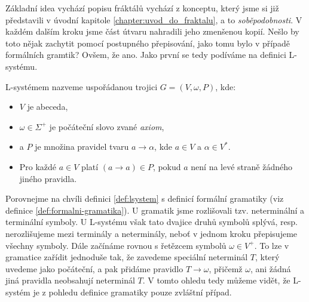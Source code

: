Základní idea vychází popisu fráktálů vychází z konceptu, který jsme si již představili v úvodní kapitole \ref{chapter:uvod_do_fraktalu}, a to \emph{soběpodobnosti}. V každém dalším kroku jsme část útvaru nahradili jeho zmenšenou kopií. Nešlo by toto nějak zachytit pomocí postupného přepisování, jako tomu bylo v případě formálních gramtik? Ovšem, že ano. Jako první se tedy podíváme na definici L-systému.
\begin{definition}[L-systém]\label{def:lsystem}
    L-systémem nazveme uspořádanou trojici $G=(V,\omega,P)$, kde:
    \begin{itemize}
        \item $V$ je abeceda,
        \item $\omega\in\Sigma^+$ je počáteční slovo zvané \emph{axiom},
        \item a $P$ je množina pravidel tvaru $a\to\alpha$, kde $a\in V$ a $\alpha\in V^*$.
        \item Pro každé $a\in V$ platí $(a\to a)\in P$, pokud $a$ není na levé straně žádného jiného pravidla.
    \end{itemize}
\end{definition}
Porovnejme na chvíli definici \ref{def:lsystem} s definicí formální gramatiky (viz definice \ref{def:formalni-gramatika}). U gramatik jsme rozlišovali tzv. neterminální a terminální symboly. U L-systému však tato dvajice druhů symbolů splývá, resp. nerozlišujeme mezi terminály a neterminály, neboť v jednom kroku přepisujeme všechny symboly. Dále začínáme rovnou s řetězcem symbolů $\omega\in V^+$. To lze v gramatice zařídit jednoduše tak, že zavedeme speciální neterminál $T$, který uvedeme jako počáteční, a pak přidáme pravidlo $T\to\omega$, přičemž $\omega$, ani žádná jiná pravidla neobsahují neterminál $T$. V tomto ohledu tedy můžeme vidět, že L-systém je z pohledu definice gramatiky pouze zvláštní případ.

